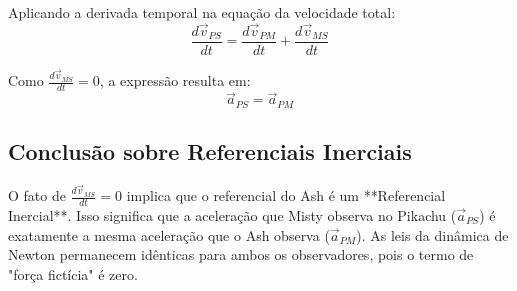 \documentclass[11pt,a4paper]{article}
\begin{document}
Aplicando a derivada temporal na equação da velocidade total:
\begin{equation}
\frac{d\vec{v}_{PS}}{dt} = \frac{d\vec{v}_{PM}}{dt} + \frac{d\vec{v}_{MS}}{dt}
\end{equation}

Como $\frac{d\vec{v}_{MS}}{dt} = 0$, a expressão resulta em:
\begin{equation}
\vec{a}_{PS} = \vec{a}_{PM}
\end{equation}

\subsection{Conclusão sobre Referenciais Inerciais}
O fato de $\frac{d\vec{v}_{MS}}{dt} = 0$ implica que o referencial do Ash é um **Referencial Inercial**. Isso significa que a aceleração que Misty observa no Pikachu ($\vec{a}_{PS}$) é exatamente a mesma aceleração que o Ash observa ($\vec{a}_{PM}$). As leis da dinâmica de Newton permanecem idênticas para ambos os observadores, pois o termo de "força fictícia" é zero.

\begin{center}
\end{center}
\end{document}
